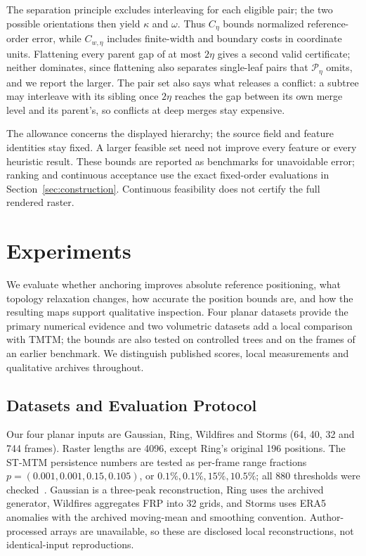 \documentclass[review]{vgtc}
\begin{document}
The separation principle excludes interleaving for each eligible pair; the two possible orientations then yield $\kappa$ and $\omega$. Thus $C_\eta$ bounds normalized reference-order error, while $C_{w,\eta}$ includes finite-width and boundary costs in coordinate units. Flattening every parent gap of at most $2\eta$ gives a second valid certificate; neither dominates, since flattening also separates single-leaf pairs that $\mathcal{P}_\eta$ omits, and we report the larger. The pair set also says what releases a conflict: a subtree may interleave with its sibling once $2\eta$ reaches the gap between its own merge level and its parent's, so conflicts at deep merges stay expensive.

The allowance concerns the displayed hierarchy; the source field and feature identities stay fixed. A larger feasible set need not improve every feature or every heuristic result. These bounds are reported as benchmarks for unavoidable error; ranking and continuous acceptance use the exact fixed-order evaluations in Section~\ref{sec:construction}. Continuous feasibility does not certify the full rendered raster.

\section{Experiments}\label{sec:experiments}
We evaluate whether anchoring improves absolute reference positioning, what topology relaxation changes, how accurate the position bounds are, and how the resulting maps support qualitative inspection. Four planar datasets provide the primary numerical evidence and two volumetric datasets add a local comparison with TMTM; the bounds are also tested on controlled trees and on the frames of an earlier benchmark. We distinguish published scores, local measurements and qualitative archives throughout.

\subsection{Datasets and Evaluation Protocol}
Our four planar inputs are Gaussian, Ring, Wildfires and Storms (64, 40, 32 and 744 frames). Raster lengths are 4096, except Ring's original 196 positions. The ST-MTM persistence numbers are tested as per-frame range fractions $p=(0.001,0.001,0.15,0.105)$, or $0.1\%,0.1\%,15\%,10.5\%$; all 880 thresholds were checked~\cite{STMTM:2026}. Gaussian is a three-peak reconstruction, Ring uses the archived generator, Wildfires aggregates FRP into 32 grids, and Storms uses ERA5 anomalies with the archived moving-mean and smoothing convention. Author-processed arrays are unavailable, so these are disclosed local reconstructions, not identical-input reproductions.
\end{document}
